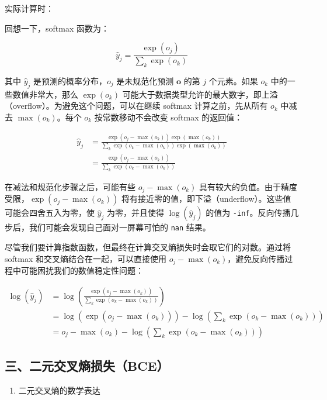 实际计算时：

回想一下，softmax 函数为：

\[
\hat{y}_j=\frac{\exp(o_j)}{\sum_k\exp(o_k)}
\]

其中 \(\hat{y}_j\) 是预测的概率分布，\(o_j\) 是未规范化预测 \(\mathbf{o}\) 的第 \(j\) 个元素。如果 \(o_k\) 中的一些数值非常大，那么 \(\exp(o_k)\) 可能大于数据类型允许的最大数字，即上溢（overflow）。为避免这个问题，可以在继续 softmax 计算之前，先从所有 \(o_k\) 中减去 \(\max(o_k)\)。每个 \(o_k\) 按常数移动不会改变 softmax 的返回值：

\[
\begin{aligned}
\hat{y}_j
&=\frac{\exp(o_j-\max(o_k))\exp(\max(o_k))}
{\sum_k\exp(o_k-\max(o_k))\exp(\max(o_k))}\\
&=\frac{\exp(o_j-\max(o_k))}
{\sum_k\exp(o_k-\max(o_k))}
\end{aligned}
\]

在减法和规范化步骤之后，可能有些 \(o_j-\max(o_k)\) 具有较大的负值。由于精度受限，\(\exp(o_j-\max(o_k))\) 将有接近零的值，即下溢（underflow）。这些值可能会四舍五入为零，使 \(\hat{y}_j\) 为零，并且使得 \(\log(\hat{y}_j)\) 的值为 \texttt{-inf}。反向传播几步后，我们可能会发现自己面对一屏幕可怕的 \texttt{nan} 结果。

尽管我们要计算指数函数，但最终在计算交叉熵损失时会取它们的对数。通过将 softmax 和交叉熵结合在一起，可以直接使用 \(o_j-\max(o_k)\)，避免反向传播过程中可能困扰我们的数值稳定性问题：

\[
\begin{aligned}
\log(\hat{y}_j)
&=\log\left(\frac{\exp(o_j-\max(o_k))}
{\sum_k\exp(o_k-\max(o_k))}\right)\\
&=\log(\exp(o_j-\max(o_k)))
-\log\left(\sum_k\exp(o_k-\max(o_k))\right)\\
&=o_j-\max(o_k)-\log\left(\sum_k\exp(o_k-\max(o_k))\right)
\end{aligned}
\]

\hypertarget{ux4e09ux4e8cux5143ux4ea4ux53c9ux71b5ux635fux5931bce}{%
\subsection{三、二元交叉熵损失（BCE）}\label{ux4e09ux4e8cux5143ux4ea4ux53c9ux71b5ux635fux5931bce}}

\begin{enumerate}
\def\labelenumi{\arabic{enumi}.}
\tightlist
\item
  二元交叉熵的数学表达
\end{enumerate}

